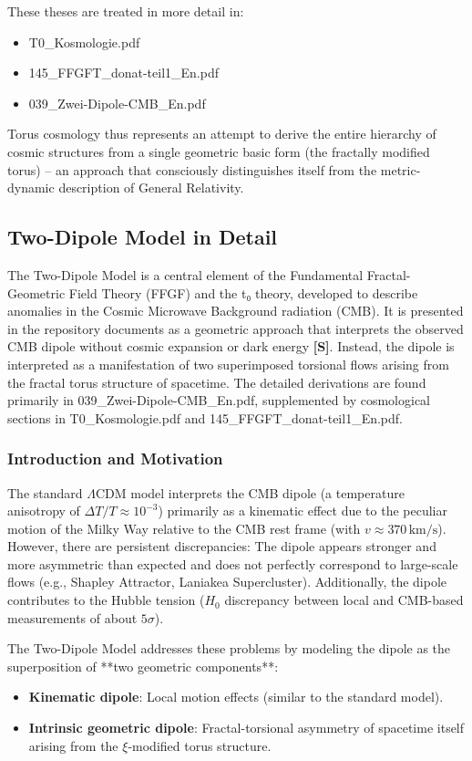 These theses are treated in more detail in:
\begin{itemize}
	\item T0\_Kosmologie.pdf
	\item 145\_FFGFT\_donat-teil1\_En.pdf
	\item 039\_Zwei-Dipole-CMB\_En.pdf
\end{itemize}

Torus cosmology thus represents an attempt to derive the entire hierarchy of cosmic structures from a single geometric basic form (the fractally modified torus) – an approach that consciously distinguishes itself from the metric-dynamic description of General Relativity.

\subsection{Two-Dipole Model in Detail}

The Two-Dipole Model is a central element of the Fundamental Fractal-Geometric Field Theory (FFGF) and the t₀ theory, developed to describe anomalies in the Cosmic Microwave Background radiation (CMB). It is presented in the repository documents as a geometric approach that interprets the observed CMB dipole without cosmic expansion or dark energy \textbf{[S]}. Instead, the dipole is interpreted as a manifestation of two superimposed torsional flows arising from the fractal torus structure of spacetime. The detailed derivations are found primarily in 039\_Zwei-Dipole-CMB\_En.pdf, supplemented by cosmological sections in T0\_Kosmologie.pdf and 145\_FFGFT\_donat-teil1\_En.pdf.

\subsubsection{Introduction and Motivation}

The standard $\Lambda$CDM model interprets the CMB dipole (a temperature anisotropy of $\Delta T / T \approx 10^{-3}$) primarily as a kinematic effect due to the peculiar motion of the Milky Way relative to the CMB rest frame (with $v \approx 370\,\text{km/s}$). However, there are persistent discrepancies: The dipole appears stronger and more asymmetric than expected and does not perfectly correspond to large-scale flows (e.g., Shapley Attractor, Laniakea Supercluster). Additionally, the dipole contributes to the Hubble tension ($H_0$ discrepancy between local and CMB-based measurements of about $5\sigma$).

The Two-Dipole Model addresses these problems by modeling the dipole as the superposition of **two geometric components**:
\begin{itemize}
	\item \textbf{Kinematic dipole}: Local motion effects (similar to the standard model).
	\item \textbf{Intrinsic geometric dipole}: Fractal-torsional asymmetry of spacetime itself arising from the $\xi$-modified torus structure.
\end{itemize}

